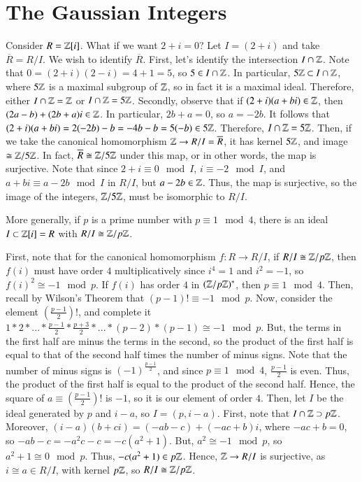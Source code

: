 \documentclass[12pt, a4paper, twoside, openright, titlepage]{book}
\begin{document}
\section{\textsection The Gaussian Integers}

\begin{eg}{}{}
        Consider $R = \mathbb Z[i]$. What if we want $2+i = 0$? Let $I = (2+i)$ and take $\overline{R} = R/I$. We wish to identify $\overline{R}$. First, let's identify the intersection $I \cap \mathbb Z$. Note that $0 = (2+i)(2-i) = 4+1 = 5$, so $5 \in I\cap \mathbb Z$. In particular, $5\mathbb Z \subset I\cap \mathbb Z$, where $5\mathbb Z$ is a maximal subgroup of $\mathbb Z$, so in fact it is a maximal ideal. Therefore, either $I\cap \mathbb Z = \mathbb Z$ or $I\cap \mathbb Z = 5\mathbb Z$. Secondly, observe that if $(2+i)(a+bi) \in \mathbb Z$, then $(2a-b)+(2b+a)i \in \mathbb Z$. In particular, $2b+a = 0$, so $a = -2b$. It follows that $(2+i)(a+bi) = 2(-2b)-b = -4b - b = 5(-b) \in 5\mathbb Z$. Therefore, $I\cap \mathbb Z = 5\mathbb Z$. Then, if we take the canonical homomorphism $\mathbb Z\rightarrow R/I = \overline{R}$, it has kernel $5\mathbb Z$, and image $\cong \mathbb Z/5\mathbb Z$. In fact, $\overline{R} \cong \mathbb Z/5\mathbb Z$ under this map, or in other words, the map is surjective. Note that since $2+i \equiv 0 \mod I$, $i \equiv -2 \mod I$, and $a+bi \equiv a-2b \mod I$ in $R/I$, but $a-2b \in \mathbb Z$. Thus, the map is surjective, so the image of the integers, $\mathbb Z/5\mathbb Z$, must be isomorphic to $R/I$.
\end{eg}

\begin{thm}{}{}
        More generally, if $p$ is a prime number with $p\equiv 1 \mod 4$, there is an ideal $I \subset \mathbb Z[i]=R$ with $R/I \cong \mathbb Z/p\mathbb Z$.
\end{thm}
\begin{proof*}{}{}
        First, note that for the canonical homomorphism $f:R\rightarrow R/I$, if $R/I \cong \mathbb Z/p\mathbb Z$, then $f(i)$ must have order $4$ multiplicatively since $i^4 = 1$ and $i^2 = -1$, so $f(i)^2 \cong -1 \mod p$. If $f(i)$ has order $4$ in $(\mathbb Z/p\mathbb Z)^*$, then $p \equiv 1 \mod 4$. Then, recall by Wilson's Theorem that $(p-1)! \equiv -1 \mod p$. Now, consider the element $\left(\frac{p-1}{2}\right)!$, and complete it $1*2*...*\frac{p-1}{2}*\frac{p+3}{2}*...*(p-2)*(p-1) \cong -1 \mod p$. But, the terms in the first half are minus the terms in the second, so the product of the first half is equal to that of the second half times the number of minus signs. Note that the number of minus signs is $(-1)^{\frac{p-1}{2}}$, and since $p \equiv 1 \mod 4$, $\frac{p-1}{2}$ is even. Thus, the product of the first half is equal to the product of the second half. Hence, the square of $a\equiv\left(\frac{p-1}{2}\right)!$ is $-1$, so it is our element of order $4$. Then, let $I$ be the ideal generated by $p$ and $i-a$, so $I = (p,i-a)$. First, note that $I\cap \mathbb Z \supset p\mathbb Z$. Moreover, $(i-a)(b+ci) = (-ab-c)+(-ac+b)i$, where $-ac +b = 0$, so $-ab-c = -a^2c-c = -c(a^2+1)$. But, $a^2 \cong -1 \mod p$, so $a^2 + 1 \cong 0 \mod p$. Thus, $-c(a^2+1) \in p\mathbb Z$. Hence, $\mathbb Z\rightarrow R/I$ is surjective, as $i\cong a \in R/I$, with kernel $p\mathbb Z$, so $R/I\cong \mathbb Z/p\mathbb Z$.
\end{proof*}
\end{document}
